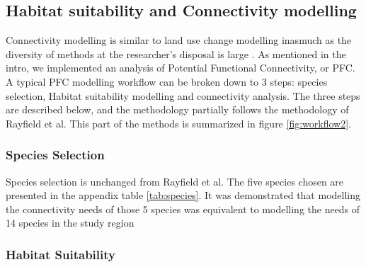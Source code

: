 \subsection{Habitat suitability and Connectivity modelling}

Connectivity modelling is similar to land use change modelling inasmuch as the diversity of methods at the researcher’s disposal is large \citep{calabrese_comparison_2004}. As mentioned in the intro, we implemented an analysis of Potential Functional Connectivity, or PFC. A typical PFC modelling workflow can be broken down to 3 steps: species selection, Habitat suitability modelling and connectivity analysis. The three steps are described below, and the methodology partially follows the methodology of Rayfield et al. This part of the methods is summarized in figure \ref{fig:workflow2}.\\

\subsubsection{Species Selection}

Species selection is unchanged from Rayfield et al. The five species chosen are presented in the appendix table \ref{tab:species}. It was demonstrated that modelling the connectivity needs of those 5 species was equivalent to modelling the needs of 14 species in the study region \citep{meurant_selecting_2018, albert_applying_2017}\\

\subsubsection{Habitat Suitability}


